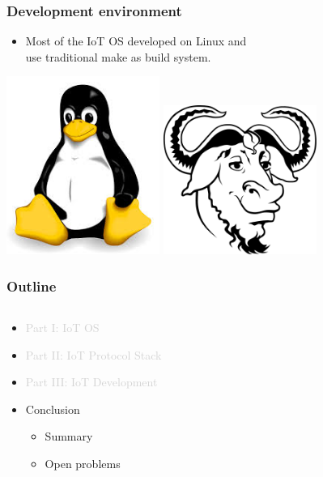 \documentclass{beamer}
\begin{document}
\begin{frame}
	\frametitle{Development environment}
	\vspace{.1cm}
	\begin{itemize}
		\justifying
		\item Most of the IoT OS developed on \textcolor{TextOrange}{Linux} and\\
		use \textcolor{TextGreen}{traditional make} as build system.
	\end{itemize}
	\vspace{.5cm}
	\hspace*{.5cm}
	\includegraphics[width=5cm]{figs/linux-logo.jpeg}
	\includegraphics[width=5cm]{figs/gun-logo.png}
\end{frame}

\begin{frame}
	\frametitle{Outline}
	\begin{columns}[c]
		\begin{column}{30cm}
			\vspace{.1cm}
			\begin{itemize}
				\justifying
				\item \textcolor{LightGray}{Part I: IoT OS}
				\item \textcolor{LightGray}{Part II: IoT Protocol Stack}
				\item \textcolor{LightGray}{Part III: IoT Development}
				\item Conclusion
				\begin{itemize}
					\item Summary
					\item Open problems
				\end{itemize}				
			\end{itemize}
		\end{column}
	\end{columns}
\end{frame}
\end{document}
